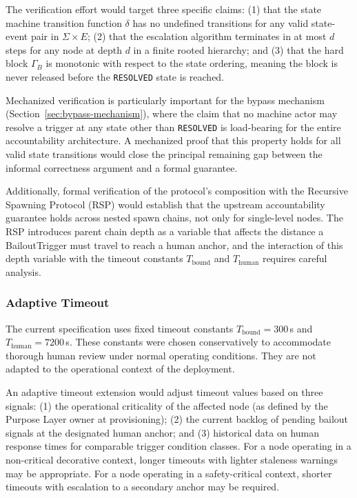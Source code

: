The verification effort would target three specific claims: (1) that the state machine transition function $\delta$ has no undefined transitions for any valid state-event pair in $\Sigma \times E$; (2) that the escalation algorithm terminates in at most $d$ steps for any node at depth $d$ in a finite rooted hierarchy; and (3) that the hard block $\Gamma_B$ is monotonic with respect to the state ordering, meaning the block is never released before the \texttt{RESOLVED} state is reached.

Mechanized verification is particularly important for the bypass mechanism (Section~\ref{sec:bypass-mechanism}), where the claim that no machine actor may resolve a trigger at any state other than \texttt{RESOLVED} is load-bearing for the entire accountability architecture. A mechanized proof that this property holds for all valid state transitions would close the principal remaining gap between the informal correctness argument and a formal guarantee.

Additionally, formal verification of the protocol's composition with the Recursive Spawning Protocol (RSP) would establish that the upstream accountability guarantee holds across nested spawn chains, not only for single-level nodes. The RSP introduces parent chain depth as a variable that affects the distance a BailoutTrigger must travel to reach a human anchor, and the interaction of this depth variable with the timeout constants $T_{\text{bound}}$ and $T_{\text{human}}$ requires careful analysis.

\subsubsection{Adaptive Timeout}\label{sec:adaptive-timeout}

The current specification uses fixed timeout constants $T_{\text{bound}}=300$\,s and $T_{\text{human}}=7200$\,s. These constants were chosen conservatively to accommodate thorough human review under normal operating conditions. They are not adapted to the operational context of the deployment.

An adaptive timeout extension would adjust timeout values based on three signals: (1) the operational criticality of the affected node (as defined by the Purpose Layer owner at provisioning); (2) the current backlog of pending bailout signals at the designated human anchor; and (3) historical data on human response times for comparable trigger condition classes. For a node operating in a non-critical decorative context, longer timeouts with lighter staleness warnings may be appropriate. For a node operating in a safety-critical context, shorter timeouts with escalation to a secondary anchor may be required.

